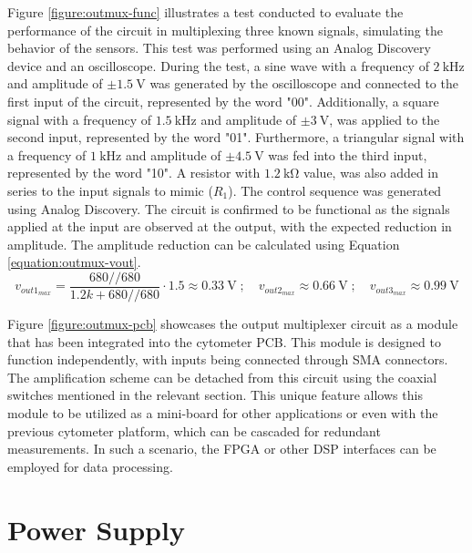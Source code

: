 Figure \ref{figure:outmux-func} illustrates a test conducted to evaluate the performance of the circuit in multiplexing three known signals, simulating the behavior of the sensors. This test was performed using an Analog Discovery device and an oscilloscope. During the test, a sine wave with a frequency of $\mathrm{2~kHz}$ and amplitude of $\mathrm{\pm 1.5~V}$ was generated by the oscilloscope and connected to the first input of the circuit, represented by the word "00". Additionally, a square signal with a frequency of $\mathrm{1.5~kHz}$ and amplitude of $\mathrm{\pm 3~V}$, was applied to the second input, represented by the word "01". Furthermore, a triangular signal with a frequency of $\mathrm{1~kHz}$ and amplitude of $\mathrm{\pm 4.5~V}$ was fed into the third input, represented by the word "10". A resistor with $\mathrm{1.2~k\Omega}$ value, was also added in series to the input signals to mimic ($R_1$). The control sequence was generated using Analog Discovery. The circuit is confirmed to be functional as the signals applied at the input are observed at the output, with the expected reduction in amplitude. The amplitude reduction can be calculated using Equation \ref{equation:outmux-vout}.
\begin{equation}
    \nonumber v_{out1_{max}} = \frac{680//680}{1.2k+680//680} \cdot 1.5 \approx 0.33~\mathrm{V}\;;\quad v_{out2_{max}} \approx 0.66~\mathrm{V}\;;\quad v_{out3_{max}} \approx 0.99~\mathrm{V}
\end{equation}

Figure \ref{figure:outmux-pcb} showcases the output multiplexer circuit as a module that has been integrated into the cytometer \ac{PCB}. This module is designed to function independently, with inputs being connected through SMA connectors. The amplification scheme can be detached from this circuit using the coaxial switches mentioned in the relevant section. This unique feature allows this module to be utilized as a mini-board for other applications or even with the previous cytometer platform, which can be cascaded for redundant measurements. In such a scenario, the \ac{FPGA} or other \ac{DSP} interfaces can be employed for data processing.

\section{Power Supply}
\label{chapter:fe-power}


